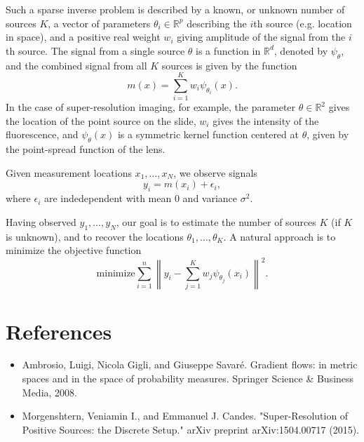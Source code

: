 \documentclass[11pt]{article}
\begin{document}
Such a sparse inverse problem is described by a known,
or unknown number of sources $K$, a vector of parameters $\theta_i \in
\mathbb{R}^p$ describing the $i$th source (e.g. location in space),
and a positive real weight $w_i$ giving amplitude of the signal from
the $i$th source.  The signal from a single source $\theta$ is a
function in $\mathbb{R}^d$, denoted by $\psi_\theta$,
and the combined signal from all $K$ sources is given by the function
\[
m(x) = \sum_{i=1}^K w_i \psi_{\theta_i}(x).
\]
In the case of super-resolution imaging, for example, the parameter
$\theta \in \mathbb{R}^2$ gives the location of the point source on
the slide, $w_i$ gives the intensity of the fluorescence, and
$\psi_{\theta}(x)$ is a symmetric kernel function centered at $\theta$,
given by the point-spread function of the lens.

Given measurement locations $x_1,\hdots, x_N$, we observe signals
\[
y_i = m(x_i) + \epsilon_i,
\]
where $\epsilon_i$ are indedependent with mean $0$ and variance $\sigma^2$.

Having observed $y_1,\hdots, y_N$, our goal is to estimate the number
of sources $K$ (if $K$ is unknown), and to recover the locations
$\theta_1,\hdots, \theta_K$.
A natural approach is to minimize the objective function
\[
\text{minimize} \sum_{i=1}^n \left\|y_i - \sum_{j=1}^K w_j \psi_{\theta_j}(x_i) \right\|^2.
\]

\section{References}

\begin{itemize}
\item Ambrosio, Luigi, Nicola Gigli, and Giuseppe Savaré. Gradient flows: in metric spaces and in the space of probability measures. Springer Science \& Business Media, 2008.
\item Morgenshtern, Veniamin I., and Emmanuel J. Candes. "Super-Resolution of Positive Sources: the Discrete Setup." arXiv preprint arXiv:1504.00717 (2015).
\end{itemize}
\end{document}
